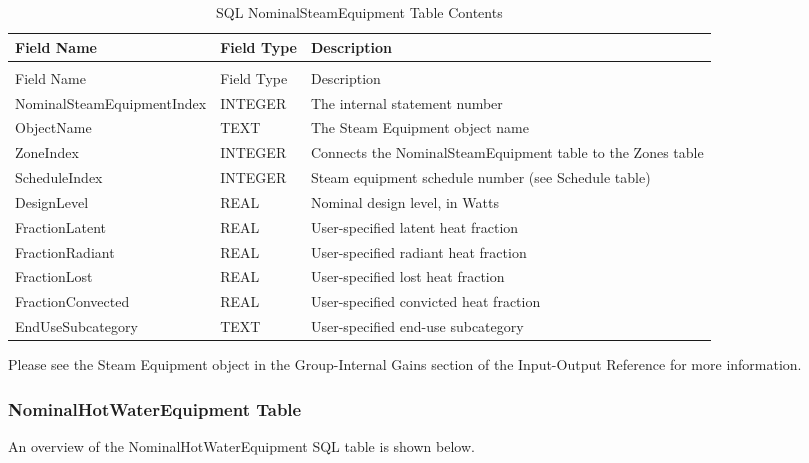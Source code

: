 {\scriptsize
\begin{longtable}[c]{>{\raggedright}p{1.5in}>{\raggedright}p{1.5in}>{\raggedright}p{2.99in}}
\caption{SQL NominalSteamEquipment Table Contents \label{table:table-19.-sql-nominalsteamequipment-table}} \tabularnewline
\toprule 
Field Name & Field Type & Description \tabularnewline
\midrule
\endfirsthead

\caption[]{SQL NominalSteamEquipment Table Contents} \tabularnewline
\toprule 
Field Name & Field Type & Description \tabularnewline
\midrule
\endhead

Nominal\-Steam\-Equipment\-Index & INTEGER & The internal statement number \tabularnewline
ObjectName & TEXT & The Steam Equipment object name \tabularnewline
ZoneIndex & INTEGER & Connects the NominalSteamEquipment table to the Zones table \tabularnewline
ScheduleIndex & INTEGER & Steam equipment schedule number (see Schedule table) \tabularnewline
DesignLevel & REAL & Nominal design level, in Watts \tabularnewline
FractionLatent & REAL & User-specified latent heat fraction \tabularnewline
FractionRadiant & REAL & User-specified radiant heat fraction \tabularnewline
FractionLost & REAL & User-specified lost heat fraction \tabularnewline
FractionConvected & REAL & User-specified convicted heat fraction \tabularnewline
EndUseSubcategory & TEXT & User-specified end-use subcategory \tabularnewline
\bottomrule
\end{longtable}}

Please see the Steam Equipment object in the Group-Internal Gains section of the Input-Output Reference for more information.

\subsubsection{NominalHotWaterEquipment Table}

An overview of the NominalHotWaterEquipment SQL table is shown below.

